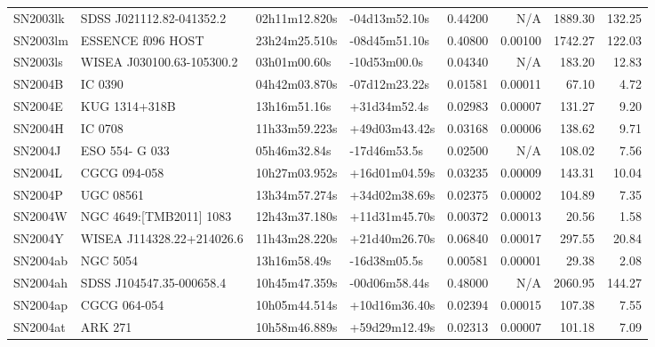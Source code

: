 \begin{longtable}{llllrrrr}
SN2003lk         &        SDSS J021112.82-041352.2 &   02h11m12.820s &   -04d13m52.10s &  0.44200 &      N/A &  1889.30 &      132.25 \\
SN2003lm         &               ESSENCE f096 HOST &   23h24m25.510s &   -08d45m51.10s &  0.40800 &  0.00100 &  1742.27 &      122.03 \\
SN2003ls         &       WISEA J030100.63-105300.2 &    03h01m00.60s &    -10d53m00.0s &  0.04340 &      N/A &   183.20 &       12.83 \\
SN2004B          &                         IC 0390 &   04h42m03.870s &   -07d12m23.22s &  0.01581 &  0.00011 &    67.10 &        4.72 \\
SN2004E          &                   KUG 1314+318B &    13h16m51.16s &    +31d34m52.4s &  0.02983 &  0.00007 &   131.27 &        9.20 \\
SN2004H          &                         IC 0708 &   11h33m59.223s &   +49d03m43.42s &  0.03168 &  0.00006 &   138.62 &        9.71 \\
SN2004J          &                  ESO 554- G 033 &    05h46m32.84s &    -17d46m53.5s &  0.02500 &      N/A &   108.02 &        7.56 \\
SN2004L          &                    CGCG 094-058 &   10h27m03.952s &   +16d01m04.59s &  0.03235 &  0.00009 &   143.31 &       10.04 \\
SN2004P          &                       UGC 08561 &   13h34m57.274s &   +34d02m38.69s &  0.02375 &  0.00002 &   104.89 &        7.35 \\
SN2004W          &         NGC 4649:[TMB2011] 1083 &   12h43m37.180s &   +11d31m45.70s &  0.00372 &  0.00013 &    20.56 &        1.58 \\
SN2004Y          &       WISEA J114328.22+214026.6 &   11h43m28.220s &   +21d40m26.70s &  0.06840 &  0.00017 &   297.55 &       20.84 \\
SN2004ab         &                        NGC 5054 &    13h16m58.49s &    -16d38m05.5s &  0.00581 &  0.00001 &    29.38 &        2.08 \\
SN2004ah         &        SDSS J104547.35-000658.4 &   10h45m47.359s &   -00d06m58.44s &  0.48000 &      N/A &  2060.95 &      144.27 \\
SN2004ap         &                    CGCG 064-054 &   10h05m44.514s &   +10d16m36.40s &  0.02394 &  0.00015 &   107.38 &        7.55 \\
SN2004at         &                         ARK 271 &   10h58m46.889s &   +59d29m12.49s &  0.02313 &  0.00007 &   101.18 &        7.09 \\

\end{longtable}

